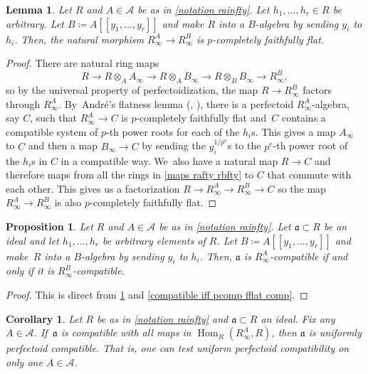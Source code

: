 \documentclass[11pt]{article}
\let\autoref\cref
\theoremstyle{plain}
\newtheorem{corollary}[theorem]{Corollary}
\newtheorem{proposition}[theorem]{Proposition}
\newtheorem{lemma}[theorem]{Lemma}
\theoremstyle{definition}
\numberwithin{equation}{theorem}
\let\tensor\otimes
\newcommand{\fra}{\mathfrak{a}}
\DeclareMathOperator{\Hom}{Hom}
\newcommand{\llbracket}{[\![}
\newcommand{\rrbracket}{]\!]}
\newcommand{\sA}{\mathcal{A}}
\newcommand{\unpe}{{1/{p^e}}}
\newcommand{\pe}{{p^e}}
\newcommand{\rafty}{R^A_\infty}
\newcommand{\rbfty}{R^B_\infty}
\begin{document}
\begin{lemma}\label{rafty to rbfty is pure when adding roots}
Let $R$ and $A\in \sA$ be as in \autoref{notation rainfty}. Let $h_1,\ldots,h_r\in R$ be arbitrary. Let $B\coloneqq A\llbracket y_1,\ldots,y_r \rrbracket$ and make $R$ into a $B$-algebra by sending $y_i$ to $h_i$. Then, the natural morphism $\rafty\to \rbfty$ is $p$-completely faithfully flat.
\end{lemma}

\begin{proof}
There are natural ring maps
\begin{equation}\label{maps rafty rbfty}
R \to R\tensor_A A_\infty \to R\tensor_A B_\infty \to R\tensor_B B_\infty \to \rbfty,
\end{equation}
so by the universal property of perfectoidization, the map $R\to \rbfty$ factors through $\rafty$. By~André's flatness lemma (\cite[Th.\,2.5.1]{AndreConjectureFacteurDirect}, \cite[Th.\,7.14]{BhattScholzePrisms}), there is a perfectoid $\rafty$-algebra, say $C$, such that $\rafty\to C$ is $p$-completely faithfully flat and~$C$ contains a compatible system of $p$-th power roots for each of the $h_i$s. This gives a map $A_\infty$ to $C$ and then a map $B_\infty \to C$ by sending the $y_i^{\unpe}$s to the $\pe$-th power root of the $h_i$s in $C$ in a compatible way. We~also have a natural map $R\to C$ and therefore maps from all the rings in \autoref{maps rafty rbfty} to $C$ that commute with each other. This gives us a factorization $R\to \rafty \to \rbfty \to C$ so the map $\rafty \to \rbfty$ is also $p$-completely faithfully flat.
\end{proof}

\begin{proposition}\label{compatible with rafty iff compatible with rbfty}
Let $R$ and $A\in \sA$ be as in \autoref{notation rainfty}. Let $\fra\subset R$ be an ideal and let $h_1,\ldots,h_r$ be arbitrary elements of $R$. Let $B\coloneqq A\llbracket y_1,\ldots,y_r \rrbracket$ and make~$R$ into a $B$-algebra by sending $y_i$ to $h_i$. Then, $\fra$ is $\rafty$-compatible if and only if it is $\rbfty$-compatible.
\end{proposition}

\begin{proof}
This is direct from \autoref{rafty to rbfty is pure when adding roots} and \autoref{compatible iff pcomp fflat comp}.
\end{proof}

\begin{corollary}\label{uniformly compatible doesn't depend on the choice of A}
Let $R$ be as in \autoref{notation rainfty} and $\fra\subset R$ an ideal. Fix any $A\in \sA$. If~$\fra$ is compatible with all maps in $\Hom_R(\rafty,R)$, then $\fra$ is uniformly perfectoid compatible. That is, one can test uniform perfectoid compatibility on only one $A\in \sA$.
\end{corollary}
\end{document}
